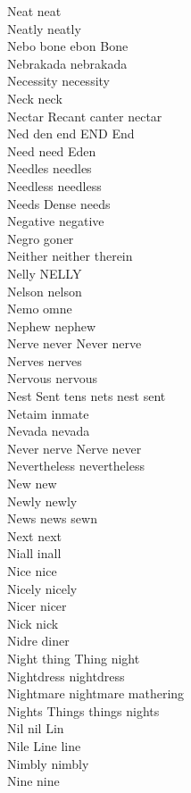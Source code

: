 Neat neat\\
Neatly neatly\\
Nebo bone ebon Bone\\
Nebrakada nebrakada\\
Necessity necessity\\
Neck neck\\
Nectar Recant canter nectar\\
Ned den end END End\\
Need need Eden\\
Needles needles\\
Needless needless\\
Needs Dense needs\\
Negative negative\\
Negro goner\\
Neither neither therein\\
Nelly NELLY\\
Nelson nelson\\
Nemo omne\\
Nephew nephew\\
Nerve never Never nerve\\
Nerves nerves\\
Nervous nervous\\
Nest Sent tens nets nest sent\\
Netaim inmate\\
Nevada nevada\\
Never nerve Nerve never\\
Nevertheless nevertheless\\
New new\\
Newly newly\\
News news sewn\\
Next next\\
Niall inall\\
Nice nice\\
Nicely nicely\\
Nicer nicer\\
Nick nick\\
Nidre diner\\
Night thing Thing night\\
Nightdress nightdress\\
Nightmare nightmare mathering\\
Nights Things things nights\\
Nil nil Lin\\
Nile Line line\\
Nimbly nimbly\\
Nine nine\\
